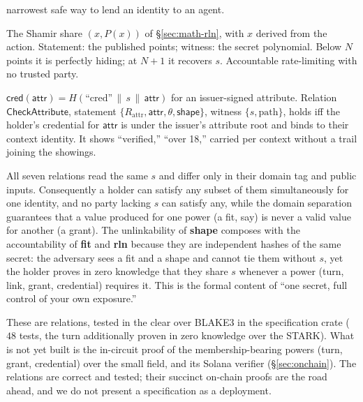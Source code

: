 \documentclass[11pt]{article}
\begin{document}
\begin{description}[leftmargin=1.3em,itemsep=0.28em]
narrowest safe way to lend an identity to an agent.
\item[6. rln.] The Shamir share $(x, P(x))$ of \S\ref{sec:math-rln}, with $x$ derived from
the action. Statement: the published points; witness: the secret polynomial. Below $N$
points it is perfectly hiding; at $N{+}1$ it recovers $s$. Accountable rate-limiting with
no trusted party.
\item[7. credential.] $\mathsf{cred}(\mathsf{attr}) = H(\text{``cred''} \,\|\, s \,\|\,
\mathsf{attr})$ for an issuer-signed attribute. Relation $\mathsf{CheckAttribute}$,
statement $\{R_{\text{attr}}, \mathsf{attr}, \theta, \mathsf{shape}\}$, witness $\{s,
\text{path}\}$, holds iff the holder's credential for $\mathsf{attr}$ is under the issuer's
attribute root and binds to their context identity. It shows ``verified,'' ``over 18,''
carried per context without a trail joining the showings.
\end{description}

\begin{property}
All seven relations read the same $s$ and differ only in their domain tag and public
inputs. Consequently a holder can satisfy any subset of them simultaneously for one
identity, and no party lacking $s$ can satisfy any, while the domain separation guarantees
that a value produced for one power (a fit, say) is never a valid value for another (a
grant). The unlinkability of \textbf{shape} composes with the accountability of
\textbf{fit} and \textbf{rln} because they are independent hashes of the same secret: the
adversary sees a fit and a shape and cannot tie them without $s$, yet the holder proves in
zero knowledge that they share $s$ whenever a power (turn, link, grant, credential) requires
it. This is the formal content of ``one secret, full control of your own exposure.''
\end{property}

\begin{honest}
These are relations, tested in the clear over BLAKE3 in the specification crate ($48$
tests, the turn additionally proven in zero knowledge over the STARK). What is not yet
built is the in-circuit proof of the membership-bearing powers (turn, grant, credential)
over the small field, and its Solana verifier (\S\ref{sec:onchain}). The relations are
correct and tested; their succinct on-chain proofs are the road ahead, and we do not
present a specification as a deployment.
\end{honest}
\end{document}
